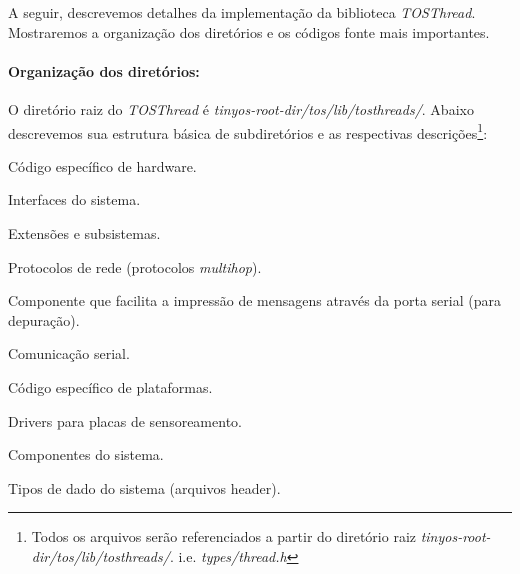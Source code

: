 A seguir, descrevemos detalhes da implementação da biblioteca \textit{TOSThread}. Mostraremos a organização dos diretórios e os
códigos fonte mais importantes.

\paragraph{Organização dos diretórios:}
O diretório raiz do \textit{TOSThread} é \textit{tinyos-root-dir/tos/lib/tosthreads/}.
Abaixo descrevemos sua estrutura básica de subdiretórios e as respectivas descrições\footnote{Todos os arquivos serão referenciados a partir do diretório
raiz \textit{tinyos-root-dir/tos/lib/tosthreads/}. i.e. \textit{types/thread.h}}:
\begin{description}
\setlength{\itemsep}{0.2pt}
\setlength{\parskip}{0pt}
\setlength{\parsep}{0pt}
    \item[chips:] Código específico de hardware.
    \item[interfaces:] Interfaces do sistema.
    \item[lib:] Extensões e subsistemas.
        \begin{description}
        \setlength{\itemsep}{0.2pt}
        \setlength{\parskip}{0pt}
        \setlength{\parsep}{0pt}
            \item[net:] Protocolos de rede (protocolos \textit{multihop}).
            \item[printf:] Componente que facilita a impressão de mensagens através da porta serial (para depuração).
            \item[serial:] Comunicação serial.
        \end{description}
    \item[platforms:] Código específico de plataformas.
    \item[sensorboards:] Drivers para placas de sensoreamento.
    \item[system:] Componentes do sistema.
    \item[types:] Tipos de dado do sistema (arquivos header).
\end{description}

